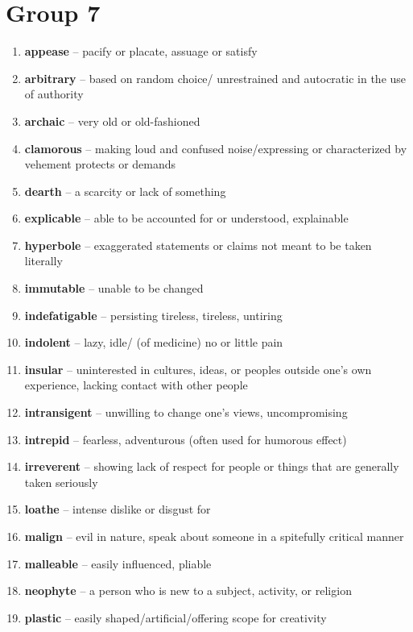 \newpage
\section{Group 7}

\begin{enumerate}[wide,labelindent=0pt]
\item \textbf{appease} -- pacify or placate, assuage or satisfy
\item \textbf{arbitrary} -- based on random choice/ unrestrained and autocratic in the use of authority
\item \textbf{archaic} -- very old or old-fashioned
\item \textbf{clamorous} -- making loud and confused noise/expressing or characterized by vehement protects or demands
\item \textbf{dearth} -- a scarcity or lack of something
\item \textbf{explicable} -- able to be accounted for or understood, explainable
\item \textbf{hyperbole} -- exaggerated statements or claims not meant to be taken literally
\item \textbf{immutable} -- unable to be changed
\item \textbf{indefatigable} -- persisting tireless, tireless, untiring
\item \textbf{indolent} -- lazy, idle/ (of medicine) no or little pain
\item \textbf{insular} -- uninterested in cultures, ideas, or peoples outside one’s own experience, lacking contact with other people
\item \textbf{intransigent} -- unwilling to change one's views, uncompromising
\item \textbf{intrepid} -- fearless, adventurous (often used for humorous effect)
\item \textbf{irreverent} -- showing lack of respect for people or things that are generally taken seriously
\item \textbf{loathe} -- intense dislike or disgust for
\item \textbf{malign} -- evil in nature, speak about someone in a spitefully critical manner
\item \textbf{malleable} -- easily influenced, pliable
\item \textbf{neophyte} -- a person who is new to a subject, activity, or religion
\item \textbf{plastic} -- easily shaped/artificial/offering scope for creativity

\end{enumerate}

